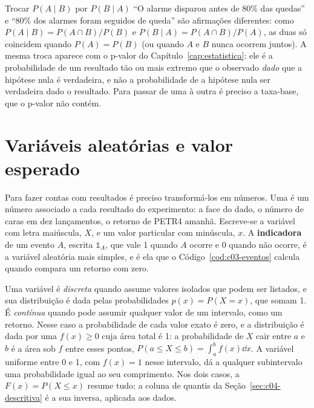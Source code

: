 \begin{armadilha}{Trocar $P(A \mid B)$ por $P(B \mid A)$}
``O alarme disparou antes de 80\% das quedas'' e ``80\% dos alarmes foram seguidos de queda'' são afirmações diferentes: como $P(A \mid B) = P(A \cap B)/P(B)$ e $P(B \mid A) = P(A \cap B)/P(A)$, as duas só coincidem quando $P(A) = P(B)$ (ou quando $A$ e $B$ nunca ocorrem juntos). A mesma troca aparece com o p-valor do Capítulo~\ref{cap:estatistica}: ele é a probabilidade de um resultado tão ou mais extremo que o observado \emph{dado} que a hipótese nula é verdadeira, e não a probabilidade de a hipótese nula ser verdadeira dado o resultado. Para passar de uma à outra é preciso a taxa-base, que o p-valor não contém.
\end{armadilha}

\section{Variáveis aleatórias e valor esperado}
\label{sec:c03-esperanca}

Para fazer contas com resultados é preciso transformá-los em números. Uma  é um número associado a cada resultado do experimento: a face do dado, o número de caras em dez lançamentos, o retorno de PETR4 amanhã. Escreve-se a variável com letra maiúscula, $X$, e um valor particular com minúscula, $x$. A \textbf{indicadora} de um evento $A$, escrita $\mathbb{1}_A$, que vale 1 quando $A$ ocorre e 0 quando não ocorre, é a variável aleatória mais simples, e é ela que o Código~\ref{cod:c03-eventos} calcula quando compara um retorno com zero.

Uma variável é \emph{discreta} quando assume valores isolados que podem ser listados, e sua distribuição é dada pelas probabilidades $p(x) = P(X = x)$, que somam 1. É \emph{contínua} quando pode assumir qualquer valor de um intervalo, como um retorno. Nesse caso a probabilidade de cada valor exato é zero, e a distribuição é dada por uma  $f(x) \ge 0$ cuja área total é 1: a probabilidade de $X$ cair entre $a$ e $b$ é a área sob $f$ entre esses pontos, $P(a \le X \le b) = \int_a^b f(x) \dd x$. A variável uniforme entre 0 e 1, com $f(x) = 1$ nesse intervalo, dá a qualquer subintervalo uma probabilidade igual ao seu comprimento. Nos dois casos, a  $F(x) = P(X \le x)$ resume tudo; a coluna de quantis da Seção~\ref{sec:c04-descritiva} é a sua inversa, aplicada aos dados.

